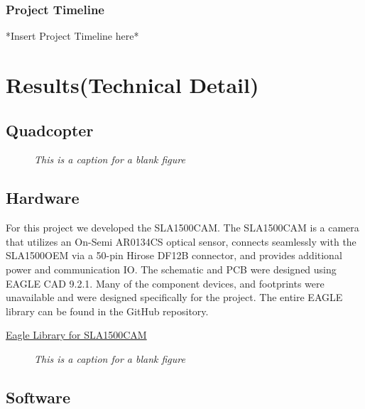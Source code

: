 \documentclass[11pt]{article}
\begin{document}
\subsubsection{Project Timeline}

*Insert Project Timeline here*







\section{Results(Technical Detail)}
\subsection{Quadcopter}

\blindtext

    \begin{figure}[H]
	\centering	
	\caption{\textit{This is a caption for a blank figure}}	
	\end{figure}

\subsection{Hardware}

For this project we developed the SLA1500CAM. The SLA1500CAM is a camera that utilizes an On-Semi AR0134CS optical sensor, connects seamlessly with the SLA1500OEM via a 50-pin Hirose DF12B connector, and provides additional power and communication IO. The schematic and PCB were designed using EAGLE CAD 9.2.1. Many of the component devices, and footprints were unavailable and were designed specifically for the project. The entire EAGLE library can be found in the GitHub repository.

\href{https://github.com/phamtaiece/Capstone-Sightline/tree/master/EAGLE\%20files/Library}{Eagle Library for SLA1500CAM}

    \begin{figure}[H]
	\centering	
	\caption{\textit{This is a caption for a blank figure}}	
	\end{figure}

\subsection{Software}
\end{document}
